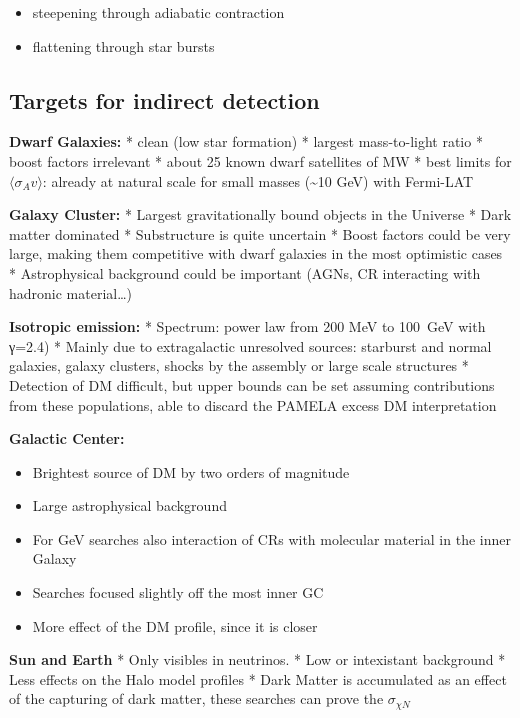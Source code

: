 \documentclass[
  letterpaper,
  DIV=11,
  numbers=noendperiod]{scrreprt}
\providecommand{\tightlist}{%
  \setlength{\itemsep}{0pt}\setlength{\parskip}{0pt}}\usepackage{longtable,booktabs,array}
\begin{document}
\begin{itemize}
\tightlist
\item
  steepening through adiabatic contraction
\item
  flattening through star bursts
\end{itemize}

\subsection{Targets for indirect
detection}\label{targets-for-indirect-detection}

\textbf{Dwarf Galaxies:} * clean (low star formation) * largest
mass-to-light ratio * boost factors irrelevant * about 25 known dwarf
satellites of MW * best limits for \(\langle \sigma_A v \rangle\):
already at natural scale for small masses (\textasciitilde10 GeV) with
Fermi-LAT

\textbf{Galaxy Cluster:} * Largest gravitationally bound objects in the
Universe * Dark matter dominated * Substructure is quite uncertain *
Boost factors could be very large, making them competitive with dwarf
galaxies in the most optimistic cases * Astrophysical background could
be important (AGNs, CR interacting with hadronic material\ldots)

\textbf{Isotropic emission:} * Spectrum: power law from 200 MeV to
100~GeV with γ=2.4) * Mainly due to extragalactic unresolved sources:
starburst and normal galaxies, galaxy clusters, shocks by the assembly
or large scale structures * Detection of DM difficult, but upper bounds
can be set assuming contributions from these populations, able to
discard the PAMELA excess DM interpretation

\textbf{Galactic Center:}

\begin{itemize}
\tightlist
\item
  Brightest source of DM by two orders of magnitude
\item
  Large astrophysical background
\item
  For GeV searches also interaction of CRs with molecular material in
  the inner Galaxy
\item
  Searches focused slightly off the most inner GC
\item
  More effect of the DM profile, since it is closer
\end{itemize}

\textbf{Sun and Earth} * Only visibles in neutrinos. * Low or
intexistant background * Less effects on the Halo model profiles * Dark
Matter is accumulated as an effect of the capturing of dark matter,
these searches can prove the \(\sigma_{\chi N}\)
\end{document}
